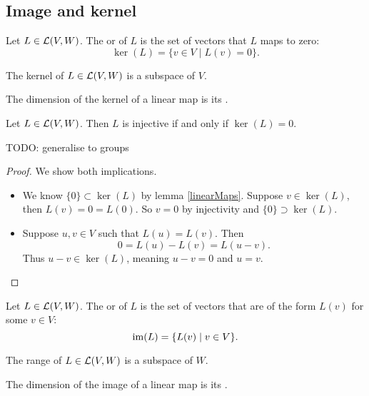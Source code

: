 \subsection{Image and kernel}
\begin{definition}
Let $L \in \operatorname{\mathcal{L}}(V,W)$. The  or  of $L$ is the set of vectors that $L$ maps to zero:
\[ \ker(L) = \{ v\in V \;|\; L(v) = 0 \}. \]
\end{definition}
\begin{proposition} \label{kernelSubspace}
The kernel of $L\in \operatorname{\mathcal{L}}(V,W)$ is a subspace of $V$.
\end{proposition}
\begin{definition}
The dimension of the kernel of a linear map is its .
\end{definition}
\begin{proposition} \label{injectivityKernelTriviality}
Let $L\in\operatorname{\mathcal{L}}(V,W)$. Then $L$ is injective if and only if $\ker(L) = 0$.
\end{proposition}
TODO: generalise to groups
\begin{proof}
We show both implications.
\begin{itemize}
\item[\boxed{\Rightarrow}] We know $\{0\}\subset \ker(L)$ by lemma \ref{linearMaps}. Suppose $v\in \ker(L)$, then $L(v) = 0 = L(0)$. So $v=0$ by injectivity and $\{0\}\supset \ker(L)$.
\item[\boxed{\Leftarrow}] Suppose $u,v \in V$ such that $L(u)=L(v)$. Then
\[ 0 = L(u) - L(v) = L(u-v). \]
Thus $u-v\in \ker(L)$, meaning $u-v = 0$ and $u=v$.
\end{itemize}
\end{proof}

\begin{definition}
Let $L \in \operatorname{\mathcal{L}}(V,W)$. The  or  of $L$ is the set of vectors that are of the form $L(v)$ for some $v\in V$:
\[ \operatorname{im}(L) = \{ L(v) \;|\; v\in V \}. \]
\end{definition}
\begin{proposition}
The range of $L\in \operatorname{\mathcal{L}}(V,W)$ is a subspace of $W$.
\end{proposition}
\begin{definition}
The dimension of the image of a linear map is its .
\end{definition}

